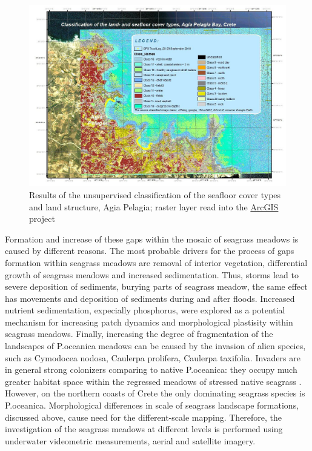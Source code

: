 \documentclass[10pt, a4paper]{article}
\begin{document}
\begin{figure}[h]
	\begin{center}
		\includegraphics[scale=0.25]{Fig-39.jpg}
		\caption{Results of the unsupervised classification of the seafloor cover types and land structure, Agia Pelagia; raster layer read into the \href{http://www.esri.com/software/arcgis/index.html}{ArcGIS} project}
		\label{fig:41}
	\end{center}
\end{figure}

Formation and increase of these
gaps within the mosaic of seagrass meadows is caused by different reasons. The most probable
drivers for the process of gaps formation within seagrass meadows are removal of interior vegetation,
differential growth of seagrass meadows and increased sedimentation. Thus, storms lead to severe
deposition of sediments, burying parts of seagrass meadow, the same effect has movements and
deposition of sediments during and after floods\cite{Bell99}\label{Bell99}.
Increased nutrient sedimentation, expecially phosphorus, were explored \cite{Jensen01}\label{Jensen01} as a
potential mechanism for increasing patch dynamics and morphological plastisity within seagrass
meadows. Finally, increasing the degree of fragmentation of the landscapes of P.oceanica meadows
can be caused by the invasion of alien species, such as Cymodocea nodosa, Caulerpa prolifera,
Caulerpa taxifolia. Invaders are in general strong colonizers comparing to native P.oceanica: they
occupy much greater habitat space within the regressed meadows of stressed native seagrass
\cite{Montefalcone10}\label{Montefalcone10}. However, on the northern coasts of Crete the only dominating seagrass
species is P.oceanica.
Morphological differences in scale of seagrass landscape formations, discussed above, cause need for
the different-scale mapping. Therefore, the investigation of the seagrass meadows at different levels is
performed using underwater videometric measurements, aerial and satellite imagery.
\end{document}
